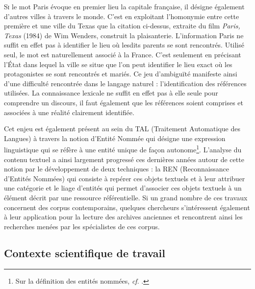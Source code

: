 \documentclass[a4paper,12pt,twoside]{book}
\begin{document}
	
	\lettrine{S}{i} le mot \og Paris\fg{} évoque en premier lieu la capitale française, il désigne également d'autres villes à travers le monde. C'est en exploitant l'homonymie entre cette première et une ville du Texas que la citation ci-dessus, extraite du film \textit{Paris, Texas} (1984) de Wim Wenders, construit la plaisanterie. L'information \og Paris\fg{} ne suffit en effet pas à identifier le lieu où lesdits parents se sont rencontrés. Utilisé seul, le mot est naturellement associé à la France. C'est seulement en précisant l'État dans lequel la ville se situe que l'on peut identifier le lieu exact où les protagonistes se sont rencontrés et mariés. Ce jeu d'ambiguïté manifeste ainsi d'une difficulté rencontrée dans le langage naturel : l'identification des références utilisées. La connaissance lexicale ne suffit en effet pas à elle seule pour comprendre un discours, il faut également que les références soient comprises et associées à une réalité clairement identifiée.
	
	Cet enjeu est également présent au sein du TAL (Traitement Automatique des Langues) à travers la notion d'Entité Nommée qui désigne une expression linguistique qui se réfère à une entité unique de façon autonome\footnote{Sur la définition des entités nommées, \textit{cf}. \cite[p. 167--170]{ehrmann_les_2008}.}. L'analyse du contenu textuel a ainsi largement progressé ces dernières années autour de cette notion par le développement de deux techniques : la REN (Reconnaissance d'Entités Nommées) qui consiste à repérer ces objets textuels et à leur attribuer une catégorie et le liage d'entités qui permet d'associer ces objets textuels à un élément décrit par une ressource référentielle. Si un grand nombre de ces travaux concernent des corpus contemporains, quelques chercheurs s'intéressent également à leur application pour la lecture des archives anciennes et rencontrent ainsi les recherches menées par les spécialistes de ces corpus.
	
	\subsection*{Contexte scientifique de travail}
	
\end{document}
